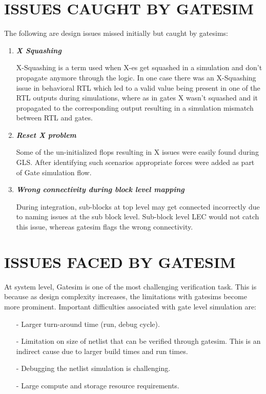 \section{ISSUES CAUGHT BY GATESIM}
The following are design issues missed initially but caught by gatesims:
\begin{enumerate}
		
	\item \emph{\bf X Squashing}

	X-Squashing is a term used when X-es get squashed in a simulation and don't propagate anymore through the logic. In one case there was an X-Squashing issue in behavioral RTL which led to a valid value being present in one of the RTL outputs during simulations, where as in gates X wasn't squashed and it propagated to the corresponding output resulting in a simulation mismatch between RTL and gates.

	\item \emph{\bf Reset X problem}

	Some of the un-initialized flops resulting in X issues were easily found during GLS.  After identifying such scenarios appropriate forces were added as part of Gate simulation flow.

	\item \emph{\bf Wrong connectivity during block level mapping}

	During integration, sub-blocks at top level may get connected incorrectly due to naming issues at the sub block level. Sub-block level LEC would not catch this issue, whereas gatesim flags the wrong connectivity.
\end{enumerate}







\section{ISSUES FACED BY GATESIM}
At system level, Gatesim is one of the most challenging verification task. This is because as design complexity increases, the limitations with gatesims become more prominent. Important difficulties associated with gate level simulation are:
\begin{itemize}


\item[-] Larger turn-around time (run, debug cycle).
\item[-] Limitation on size of netlist that can be verified through gatesim. This is an indirect cause due to larger build times and run times.
\item[-] Debugging the netlist simulation is challenging.
\item[-] Large compute and storage resource requirements. 

\end{itemize}

